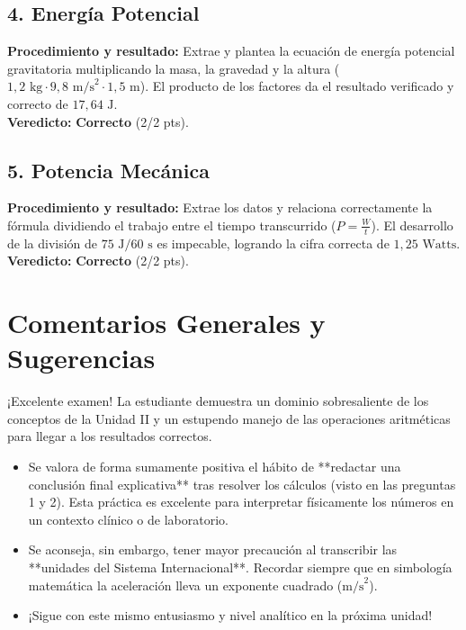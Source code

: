\documentclass[12pt,letterpaper]{article}
\begin{document}
\subsection*{4. Energía Potencial}
\textbf{Procedimiento y resultado:} Extrae y plantea la ecuación de energía potencial gravitatoria multiplicando la masa, la gravedad y la altura ($1,2 \text{ kg} \cdot 9,8 \text{ m/s}^2 \cdot 1,5 \text{ m}$). El producto de los factores da el resultado verificado y correcto de $17,64 \text{ J}$. \\
\textbf{Veredicto:} \textbf{Correcto} (2/2 pts).

\subsection*{5. Potencia Mecánica}
\textbf{Procedimiento y resultado:} Extrae los datos y relaciona correctamente la fórmula dividiendo el trabajo entre el tiempo transcurrido ($P = \frac{W}{t}$). El desarrollo de la división de $75 \text{ J} / 60 \text{ s}$ es impecable, logrando la cifra correcta de $1,25 \text{ Watts}$. \\
\textbf{Veredicto:} \textbf{Correcto} (2/2 pts).

\vspace{0.5cm}
\section*{Comentarios Generales y Sugerencias}
¡Excelente examen! La estudiante demuestra un dominio sobresaliente de los conceptos de la Unidad II y un estupendo manejo de las operaciones aritméticas para llegar a los resultados correctos.
\begin{itemize}
    \item Se valora de forma sumamente positiva el hábito de **redactar una conclusión final explicativa** tras resolver los cálculos (visto en las preguntas 1 y 2). Esta práctica es excelente para interpretar físicamente los números en un contexto clínico o de laboratorio.
    \item Se aconseja, sin embargo, tener mayor precaución al transcribir las **unidades del Sistema Internacional**. Recordar siempre que en simbología matemática la aceleración lleva un exponente cuadrado ($\text{m/s}^2$).
    \item ¡Sigue con este mismo entusiasmo y nivel analítico en la próxima unidad!
\end{itemize}
\end{document}

